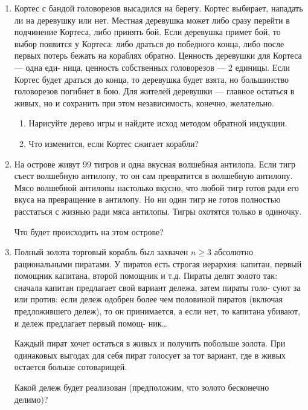 \documentclass[12pt]{article}
\begin{document}
\begin{enumerate}

   \item Кортес с бандой головорезов высадился на берегу. Кортес выбирает, нападать ли на деревушку
   или нет. Местная деревушка может либо сразу перейти в подчинение Кортеса, либо принять бой.
   Если деревушка примет бой, то выбор появится у Кортеса: либо драться до победного конца, либо
   после первых потерь бежать на кораблях обратно. Ценность деревушки для Кортеса — одна еди-
   ница, ценность собственных головорезов — 2 единицы. Если Кортес будет драться до конца, то
   деревушка будет взята, но большинство головорезов погибнет в бою. Для жителей деревушки —
   главное остаться в живых, но и сохранить при этом независимость, конечно, желательно.
   
   \begin{enumerate}
    \item Нарисуйте дерево игры и найдите исход методом обратной индукции.
    \item Что изменится, если Кортес сжигает корабли?
   \end{enumerate}
   
   \item На острове живут 99 тигров и одна вкусная волшебная антилопа.
   Если тигр съест волшебную антилопу, то он сам превратится в волшебную антилопу. 
   Мясо волшебной антилопы настолько вкусно, что любой тигр готов ради его вкуса на превращение в антилопу. 
   Но ни один тигр не готов полностью расстаться с жизнью ради мяса антилопы. Тигры
   охотятся только в одиночку.
   
   Что будет происходить на этом острове?

   \item Полный золота торговый корабль был захвачен $n\geq 3$ абсолютно рациональными пиратами.
   У пиратов есть строгая иерархия: капитан, первый помощник капитана, второй помощник и т.д.
   Пираты делят золото так: сначала капитан предлагает свой вариант дележа, затем пираты голо-
   суют за или против: если дележ одобрен более чем половиной пиратов (включая предложившего
   дележ), то он принимается, а если нет, то капитана убивают, и дележ предлагает первый помощ-
   ник\ldots
   
   Каждый пират хочет остаться в живых и получить побольше золота. При одинаковых выгодах
   для себя пират голосует за тот вариант, где в живых остается больше сотоварищей.
   
   Какой дележ будет реализован (предположим, что золото бесконечно делимо)?
   

\end{enumerate}
\end{document}
